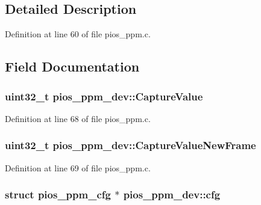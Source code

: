 \subsection{\-Detailed \-Description}


\-Definition at line 60 of file pios\-\_\-ppm.\-c.



\subsection{\-Field \-Documentation}
\hypertarget{structpios__ppm__dev_af78c364c08454847be99632c8a2f4bdf}{
\subsubsection[{\-Capture\-Value}]{\setlength{\rightskip}{0pt plus 5cm}uint32\-\_\-t {\bf pios\-\_\-ppm\-\_\-dev\-::\-Capture\-Value}}}\label{structpios__ppm__dev_af78c364c08454847be99632c8a2f4bdf}


\-Definition at line 68 of file pios\-\_\-ppm.\-c.

\hypertarget{structpios__ppm__dev_a5fee214f001bdd57610a6db6573fbd7d}{
\subsubsection[{\-Capture\-Value\-New\-Frame}]{\setlength{\rightskip}{0pt plus 5cm}uint32\-\_\-t {\bf pios\-\_\-ppm\-\_\-dev\-::\-Capture\-Value\-New\-Frame}}}\label{structpios__ppm__dev_a5fee214f001bdd57610a6db6573fbd7d}


\-Definition at line 69 of file pios\-\_\-ppm.\-c.

\hypertarget{structpios__ppm__dev_a570855666b2b9414a8e77ad4058649ce}{
\subsubsection[{cfg}]{\setlength{\rightskip}{0pt plus 5cm}struct {\bf pios\-\_\-ppm\-\_\-cfg} $\ast$ {\bf pios\-\_\-ppm\-\_\-dev\-::cfg}}}\label{structpios__ppm__dev_a570855666b2b9414a8e77ad4058649ce}


